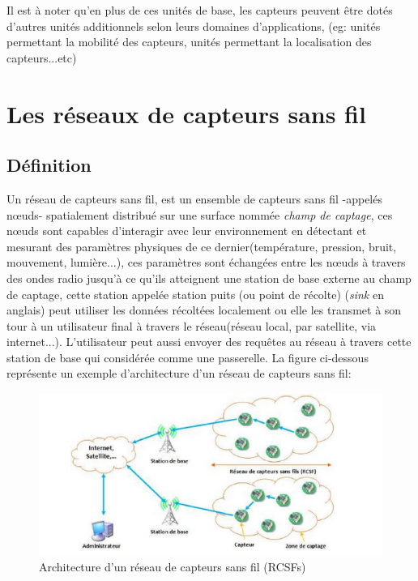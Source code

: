 	Il est à noter qu'en plus de ces unités de base, les capteurs peuvent être dotés d'autres unités additionnels selon leurs domaines d'applications, (eg: unités permettant la mobilité des capteurs, unités permettant la localisation des capteurs...etc)
		 

\newpage
\section{Les réseaux de capteurs sans fil}
\subsection{Définition}
Un réseau de capteurs sans fil, est un ensemble de capteurs  sans fil -appelés nœuds- spatialement distribué sur une surface nommée \emph{champ de captage}, ces nœuds sont capables d'interagir avec leur environnement en détectant et mesurant des paramètres physiques de ce dernier(température, pression, bruit, mouvement, lumière...), ces paramètres sont échangées entre les nœuds à travers des ondes radio jusqu'à ce qu'ils atteignent une station de base externe au champ de captage, cette station appelée station puits (ou point de récolte) (\emph{sink} en anglais) peut utiliser les données récoltées localement ou elle les transmet à son tour  à un utilisateur final à  travers le réseau(réseau local, par satellite, via internet...). L'utilisateur peut aussi envoyer des requêtes au réseau à travers cette station de base qui considérée comme une passerelle.
La figure ci-dessous représente un exemple d'architecture d'un réseau de capteurs sans fil:
\begin{figure}[h]
\begin{center}
\includegraphics[scale=1]{Chapitre1/wsn_archi.png}
\caption{Architecture d'un réseau de capteurs sans fil (RCSFs)}
\end{center}
\end{figure}


